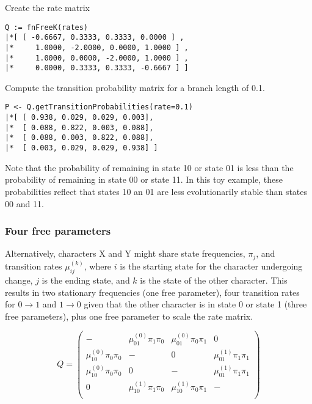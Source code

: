 Create the rate matrix

{\tt \begin{snugshade*}
\begin{lstlisting}
Q := fnFreeK(rates)
|*[ [ -0.6667, 0.3333, 0.3333, 0.0000 ] ,
|*     1.0000, -2.0000, 0.0000, 1.0000 ] ,
|*     1.0000, 0.0000, -2.0000, 1.0000 ] ,
|*     0.0000, 0.3333, 0.3333, -0.6667 ] ]
\end{lstlisting}
\end{snugshade*}}

Compute the transition probability matrix for a branch length of 0.1.

{\tt \begin{snugshade*}
\begin{lstlisting}
P <- Q.getTransitionProbabilities(rate=0.1)
|*[ [ 0.938, 0.029, 0.029, 0.003],
|*  [ 0.088, 0.822, 0.003, 0.088],
|*  [ 0.088, 0.003, 0.822, 0.088],
|*  [ 0.003, 0.029, 0.029, 0.938] ]
\end{lstlisting}
\end{snugshade*}}

Note that the probability of remaining in state 10 or state 01 is less than the probability of remaining in state 00 or state 11.
In this toy example, these probabilities reflect that states 10 an 01 are less evolutionarily stable than states 00 and 11.

\subsubsection{Four free parameters}

Alternatively, characters X and Y might share state frequencies, $\pi_j$, and transition rates $\mu_{ij}^{(k)}$, where $i$ is the starting state for the character undergoing change, $j$ is the ending state, and $k$ is the state of the other character.
This results in two stationary frequencies (one free parameter), four transition rates for $0 \rightarrow 1$ and $1 \rightarrow 0$ given that the other character is in state 0 or state 1 (three free parameters), plus one free parameter to scale the rate matrix.

\begin{equation*}
Q = \begin{pmatrix}
- & \mu_{01}^{(0)} \pi_1 \pi_0 & \mu_{01}^{(0)} \pi_0 \pi_1 & 0 \\
\mu_{10}^{(0)} \pi_0 \pi_0 & -   & 0 & \mu_{01}^{(1)} \pi_1 \pi_1 \\
\mu_{10}^{(0)} \pi_0 \pi_0 & 0   & - & \mu_{01}^{(1)} \pi_1 \pi_1 \\
0 & \mu_{10}^{(1)} \pi_1 \pi_0 & \mu_{10}^{(1)} \pi_0 \pi_1 & - \\
\end{pmatrix}
\end{equation*}

